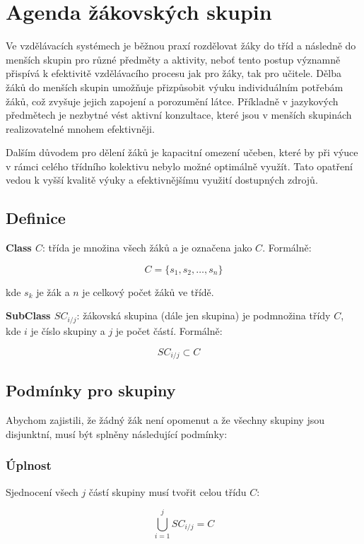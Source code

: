 \chapter{Agenda žákovských skupin}

Ve vzdělávacích systémech je běžnou praxí rozdělovat žáky do tříd a následně do menších skupin pro různé předměty a aktivity, neboť tento postup významně přispívá k efektivitě vzdělávacího procesu jak pro žáky, tak pro učitele. Dělba žáků do menších skupin umožňuje přizpůsobit výuku individuálním potřebám žáků, což zvyšuje jejich zapojení a porozumění látce. Příkladně v jazykových předmětech je nezbytné vést aktivní konzultace, které jsou v menších skupinách realizovatelné mnohem efektivněji. 

Dalším důvodem pro dělení žáků je kapacitní omezení učeben, které by při výuce v rámci celého třídního kolektivu nebylo možné optimálně využít. Tato opatření vedou k vyšší kvalitě výuky a efektivnějšímu využití dostupných zdrojů.

\section{Definice}

\textbf{Class \( C \)}: třída je množina všech žáků a je označena jako \( C \). Formálně:

\[
C = \{ s_1, s_2, \ldots, s_n \}
\]

kde \( s_k \) je žák a \( n \) je celkový počet žáků ve třídě.

\textbf{SubClass \( SC_{i/j} \)}: žákovská skupina (dále jen skupina) je podmnožina třídy \( C \), kde \( i \) je číslo skupiny a \( j \) je počet částí. Formálně:

\[
SC_{i/j} \subset C \quad
\]

\section{Podmínky pro skupiny}

Abychom zajistili, že žádný žák není opomenut a že všechny skupiny jsou disjunktní, musí být splněny následující podmínky:

\subsection*{Úplnost}

Sjednocení všech \( j \) částí skupiny musí tvořit celou třídu \( C \):

\[
\bigcup_{i=1}^{j} SC_{i/j} = C
\]

